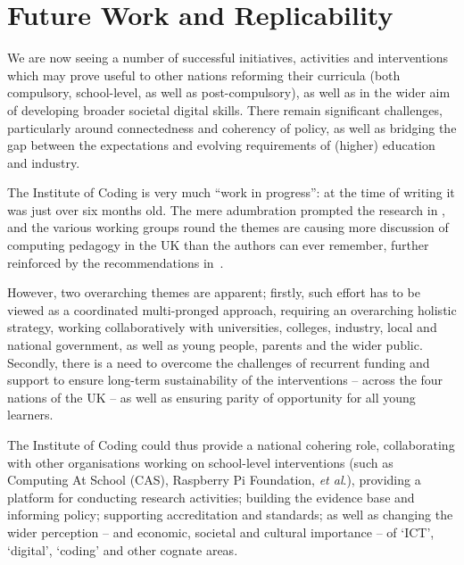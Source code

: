 \documentclass[sigconf,anonymous]{acmart}
\begin{document}
\section{Future Work and Replicability}\label{concl}

We are now seeing a number of successful initiatives, activities and
interventions which may prove useful to other nations reforming their
curricula (both compulsory, school-level, as well as post-compulsory),
as well as in the wider aim of developing broader societal digital
skills. 
There remain significant
challenges, particularly around connectedness and coherency of policy,
as well as bridging the gap between the expectations and evolving
requirements of (higher) education and industry.

The Institute of Coding is very much ``work in progress'': at the time
of writing it was just over six months old.  The mere adumbration
\cite{HMG2015a} prompted the research in
\cite{murphy-et-al:programming2017}, and the various working groups
round the themes are causing more discussion of computing pedagogy in
the UK than the authors can ever remember, further reinforced by the
recommendations in~\cite{rs:2017}.

However, two overarching themes are apparent; firstly, such effort has
to be viewed as a coordinated multi-pronged approach, requiring an
overarching holistic strategy, working collaboratively with
universities, colleges, industry, local and national government, as
well as young people, parents and the wider public. Secondly, there is
a need to overcome the challenges of recurrent funding and support to
ensure long-term sustainability of the interventions -- across the
four nations of the UK -- as well as ensuring parity of opportunity
for all young learners.

The Institute of Coding could thus provide a national cohering role,
collaborating with other organisations working on school-level
interventions (such as Computing At School (CAS), Raspberry Pi
Foundation, {\it et al\/}.), providing a platform for conducting research
activities; building the evidence base and informing policy;
supporting accreditation and standards; as well as changing the wider
perception -- and economic, societal and cultural importance -- of
`ICT', `digital', `coding' and other cognate areas.
\end{document}
